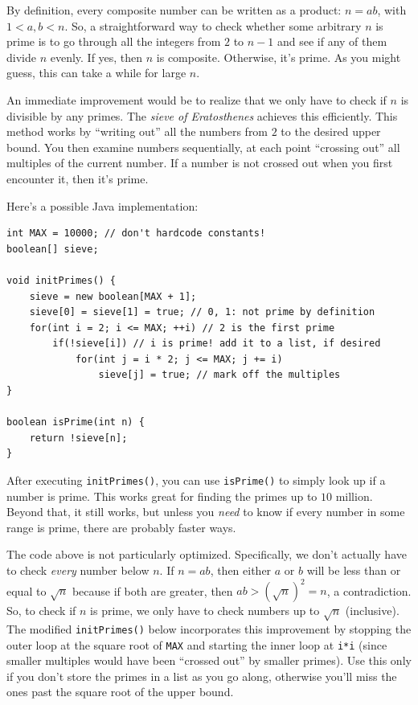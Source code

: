 \documentclass[a4paper,12pt]{article}
\begin{document}
By definition, every composite number can be written as a product: $n=ab$, with $1 < a,b < n$. So, a straightforward way to check whether some arbitrary $n$ is prime is to go through all the integers from $2$ to $n-1$ and see if any of them divide $n$ evenly. If yes, then $n$ is composite. Otherwise, it's prime. As you might guess, this can take a while for large $n$.

An immediate improvement would be to realize that we only have to check if $n$ is divisible by any primes. The {\em sieve of Eratosthenes} achieves this efficiently. This method works by ``writing out'' all the numbers from $2$ to the desired upper bound. You then examine numbers sequentially, at each point ``crossing out'' all multiples of the current number. If a number is not crossed out when you first encounter it, then it's prime. 

Here's a possible Java implementation:

\begin{lstlisting}
int MAX = 10000; // don't hardcode constants!
boolean[] sieve;

void initPrimes() {
	sieve = new boolean[MAX + 1];
	sieve[0] = sieve[1] = true; // 0, 1: not prime by definition
	for(int i = 2; i <= MAX; ++i) // 2 is the first prime
		if(!sieve[i]) // i is prime! add it to a list, if desired
			for(int j = i * 2; j <= MAX; j += i)
				sieve[j] = true; // mark off the multiples
}

boolean isPrime(int n) {
	return !sieve[n];
}
\end{lstlisting}

\noindent After executing \verb/initPrimes()/, you can use \verb/isPrime()/ to simply look up if a number is prime. This works great for finding the primes up to $10$ million. Beyond that, it still works, but unless you {\em need} to know if every number in some range is prime, there are probably faster ways.

The code above is not particularly optimized. Specifically, we don't actually have to check {\em every} number below $n$. If $n=ab$, then either $a$ or $b$ will be less than or equal to $\sqrt{n}$ because if both are greater, then $ab>\left(\sqrt{n}\right)^2=n$, a contradiction. So, to check if $n$ is prime, we only have to check numbers up to $\sqrt{n}$ (inclusive). The modified \verb/initPrimes()/ below incorporates this improvement by stopping the outer loop at the square root of \verb/MAX/ and starting the inner loop at \verb/i*i/ (since smaller multiples would have been ``crossed out'' by smaller primes). Use this only if you don't store the primes in a list as you go along, otherwise you'll miss the ones past the square root of the upper bound.
\end{document}
